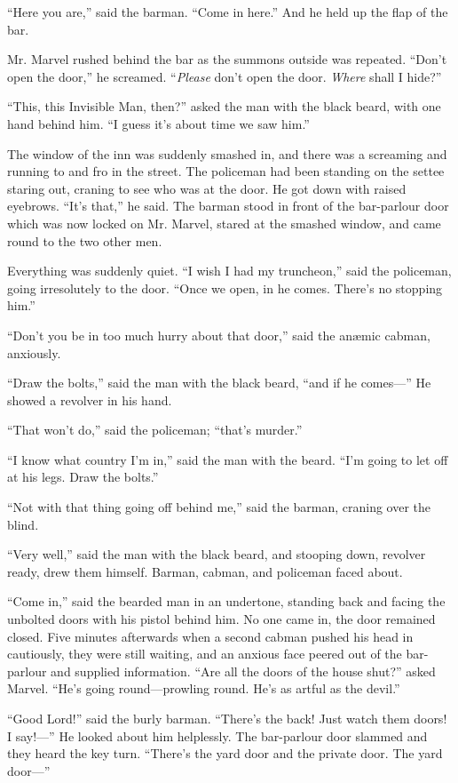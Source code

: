 “Here you are,” said the barman. “Come in here.” And he held up the flap of the bar.

Mr. Marvel rushed behind the bar as the summons outside was repeated. “Don’t open the door,” he screamed. “\emph{Please} don’t open the door. \emph{Where} shall I hide?”

“This, this Invisible Man, then?” asked the man with the black beard, with one hand behind him. “I guess it’s about time we saw him.”

The window of the inn was suddenly smashed in, and there was a screaming and running to and fro in the street. The policeman had been standing on the settee staring out, craning to see who was at the door. He got down with raised eyebrows. “It’s that,” he said. The barman stood in front of the bar-parlour door which was now locked on Mr. Marvel, stared at the smashed window, and came round to the two other men.

Everything was suddenly quiet. “I wish I had my trun\-cheon,” said the policeman, going irresolutely to the door. “Once we open, in he comes. There’s no stopping him.”

“Don’t you be in too much hurry about that door,” said the anæmic cabman, anxiously.

“Draw the bolts,” said the man with the black beard, “and if he comes—” He showed a revolver in his hand.

“That won’t do,” said the policeman; “that’s murder.”

“I know what country I’m in,” said the man with the beard. “I’m going to let off at his legs. Draw the bolts.”

“Not with that thing going off behind me,” said the barman, craning over the blind.

“Very well,” said the man with the black beard, and stooping down, revolver ready, drew them himself. Barman, cabman, and policeman faced about.

“Come in,” said the bearded man in an undertone, standing back and facing the unbolted doors with his pistol behind him. No one came in, the door remained closed. Five minutes afterwards when a second cabman pushed his head in cautiously, they were still waiting, and an anxious face peered out of the bar-parlour and supplied information. “Are all the doors of the house shut?” asked Marvel. “He’s going round—prowling round. He’s as artful as the devil.”

“Good Lord!” said the burly barman. “There’s the back! Just watch them doors! I say!—” He looked about him helplessly. The bar-parlour door slammed and they heard the key turn. “There’s the yard door and the private door. The yard door—”


